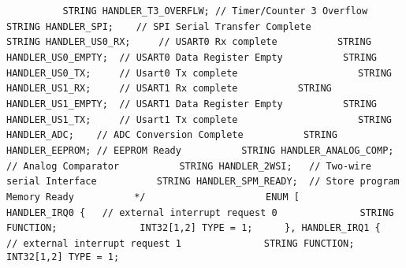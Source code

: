 {{{{\lstinline!          STRING HANDLER_T3_OVERFLW;	// Timer/Counter 3 Overflow! \newline
\lstinline!! \newline
\lstinline!          STRING HANDLER_SPI; 	// SPI Serial Transfer Complete! \newline
\lstinline!          ! \newline
\lstinline!          STRING HANDLER_US0_RX;  	// USART0 Rx complete! \newline
\lstinline!          STRING HANDLER_US0_EMPTY;	// USART0 Data Register Empty! \newline
\lstinline!          STRING HANDLER_US0_TX;  	// Usart0 Tx complete! \newline
\lstinline!          ! \newline
\lstinline!          STRING HANDLER_US1_RX;  	// USART1 Rx complete! \newline
\lstinline!          STRING HANDLER_US1_EMPTY;	// USART1 Data Register Empty! \newline
\lstinline!          STRING HANDLER_US1_TX;  	// Usart1 Tx complete! \newline
\lstinline!          ! \newline
\lstinline!          STRING HANDLER_ADC; 	// ADC Conversion Complete! \newline
\lstinline!          STRING HANDLER_EEPROM;	// EEPROM Ready! \newline
\lstinline!          STRING HANDLER_ANALOG_COMP;	// Analog Comparator! \newline
\lstinline!          STRING HANDLER_2WSI;	// Two-wire serial Interface! \newline
\lstinline!          STRING HANDLER_SPM_READY;	// Store program Memory Ready! \newline
\lstinline!          */! \newline
\lstinline!          ! \newline
\lstinline!          ENUM [! \newline
\lstinline!            HANDLER_IRQ0 {	// external interrupt request 0! \newline
\lstinline!              STRING FUNCTION;! \newline
\lstinline!              INT32[1,2] TYPE = 1;! \newline
\lstinline!	    }, HANDLER_IRQ1 {	// external interrupt request 1! \newline
\lstinline!              STRING FUNCTION;! \newline
\lstinline!              INT32[1,2] TYPE = 1;! \newline
}}}}
